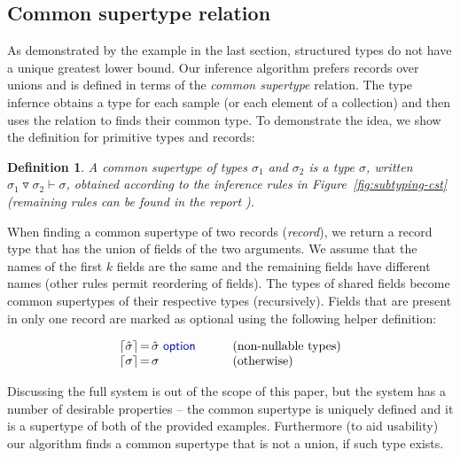 \documentclass[preprint]{sigplanconf}
\newcommand{\kvd}[1]{\textnormal{\textcolor{kvdclr}{\sffamily #1}}}
\newcommand{\narrow}[1]{\hspace{-0.85em} #1 \hspace{-0.85em}}
\newcommand{\addopt}[1]{\lceil#1\rceil}
\newtheorem{definition}{Definition}
\begin{document}


\subsection{Common supertype relation}
\label{sec:inference-commonsuper}

As demonstrated by the example in the last section, structured types do not have a unique greatest
lower bound. Our inference algorithm prefers records over unions and is defined in terms of the
\emph{common supertype} relation. The type infernce obtains a type for each sample (or each element
of a collection) and then uses the relation to finds their common type. To demonstrate the idea,
we show the definition for primitive types and records:

\begin{definition}
A \emph{common supertype} of types $\sigma_1$ and $\sigma_2$ is a type $\sigma$, written
$\sigma_1 \triangledown \sigma_2 \vdash \sigma$, obtained according to the inference rules in
Figure~\ref{fig:subtyping-cst} (remaining rules can be found in the report \cite{fsharp-data-paper}).
\end{definition}

\noindent
When finding a common supertype of two records (\emph{record}), we return a record type that has the union
of fields of the two arguments. We assume that the names of the first $k$ fields are the same and the
remaining fields have different names (other rules permit reordering of fields). The types of shared
fields become common supertypes of their respective types (recursively). Fields that are present in
only one record are marked as optional using the following helper definition:

\begin{equation*}
\begin{array}{rcll}
 \addopt{\hat{\sigma}} &\narrow{=}& \hat{\sigma}~\kvd{option} \qquad&(\textnormal{non-nullable types})\\
 \addopt{\sigma} &\narrow{=}& \sigma &(\textnormal{otherwise})
\end{array}
\end{equation*}

\noindent
Discussing the full system is out of the scope of this paper, but the system has a number of desirable
properties -- the common supertype is uniquely defined and it is a supertype of both of the
provided examples. Furthermore (to aid usability) our algorithm finds a common supertype that is not
a union, if such type exists.
\end{document}
